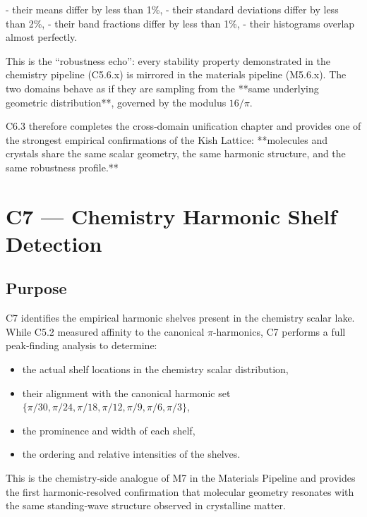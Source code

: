 \documentclass[11pt, letterpaper, openany]{book}
\begin{document}
- their means differ by less than 1\%,
- their standard deviations differ by less than 2\%,
- their band fractions differ by less than 1\%,
- their histograms overlap almost perfectly.

This is the “robustness echo”: every stability property demonstrated in the
chemistry pipeline (C5.6.x) is mirrored in the materials pipeline (M5.6.x).  
The two domains behave as if they are sampling from the **same underlying
geometric distribution**, governed by the modulus \(16/\pi\).

C6.3 therefore completes the cross‑domain unification chapter and provides one of
the strongest empirical confirmations of the Kish Lattice: **molecules and
crystals share the same scalar geometry, the same harmonic structure, and the
same robustness profile.**


\section{C7 — Chemistry Harmonic Shelf Detection}

\subsection*{Purpose}
C7 identifies the empirical harmonic shelves present in the chemistry scalar lake.
While C5.2 measured affinity to the canonical \(\pi\)-harmonics, C7 performs a
full peak‑finding analysis to determine:

\begin{itemize}
    \item the actual shelf locations in the chemistry scalar distribution,
    \item their alignment with the canonical harmonic set
          \(\{\pi/30, \pi/24, \pi/18, \pi/12, \pi/9, \pi/6, \pi/3\}\),
    \item the prominence and width of each shelf,
    \item the ordering and relative intensities of the shelves.
\end{itemize}

This is the chemistry‑side analogue of M7 in the Materials Pipeline and provides
the first harmonic‑resolved confirmation that molecular geometry resonates with
the same standing‑wave structure observed in crystalline matter.
\end{document}
